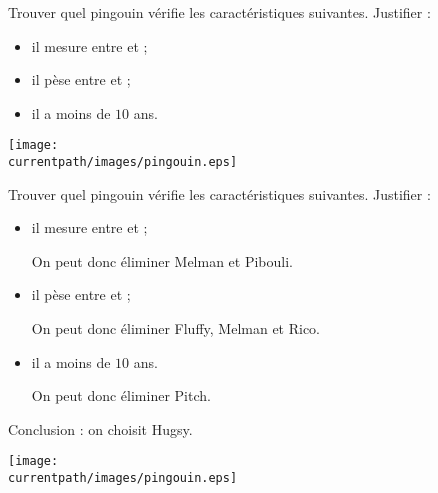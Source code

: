 \begin{exercice}
    Trouver quel pingouin vérifie les caractéristiques suivantes. Justifier :
    \begin{itemize}
       \item il mesure entre  et  ;
       \item il pèse entre  et  ;
       \item il a moins de $10$ ans.
    \end{itemize}
   \begin{center}
       \texttt{[image: \\currentpath/images/pingouin.eps]}
    \end{center}
\end{exercice}
 
\begin{corrige}
    Trouver quel pingouin vérifie les caractéristiques suivantes. Justifier :
    \begin{itemize}
       \item il mesure entre  et  ;
       
       {\color{red} On peut donc éliminer Melman et Pibouli.}
       \item il pèse entre  et  ;
       
       {\color{red} On peut donc éliminer Fluffy, Melman et Rico.}
       \item il a moins de $10$ ans.
       
       {\color{red} On peut donc éliminer Pitch.}
    \end{itemize}

    {\red Conclusion : on choisit Hugsy}.
   \begin{center}
       \texttt{[image: \\currentpath/images/pingouin.eps]}
    \end{center}
\end{corrige}